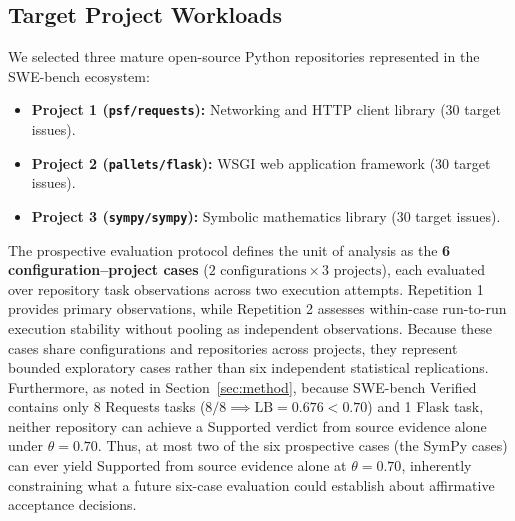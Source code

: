 \documentclass[runningheads]{llncs}
\begin{document}
\subsection{Target Project Workloads}
We selected three mature open-source Python repositories represented in the SWE-bench ecosystem:
\begin{itemize}[leftmargin=*]
    \item \textbf{Project 1 (\texttt{psf/requests}):} Networking and HTTP client library (30 target issues).
    \item \textbf{Project 2 (\texttt{pallets/flask}):} WSGI web application framework (30 target issues).
    \item \textbf{Project 3 (\texttt{sympy/sympy}):} Symbolic mathematics library (30 target issues).
\end{itemize}
The prospective evaluation protocol defines the unit of analysis as the \textbf{6 configuration--project cases} ($2 \text{ configurations} \times 3 \text{ projects}$), each evaluated over repository task observations across two execution attempts. Repetition 1 provides primary observations, while Repetition 2 assesses within-case run-to-run execution stability without pooling as independent observations. Because these cases share configurations and repositories across projects, they represent bounded exploratory cases rather than six independent statistical replications. Furthermore, as noted in Section~\ref{sec:method}, because SWE-bench Verified contains only 8 Requests tasks ($8/8 \implies \text{LB} = 0.676 < 0.70$) and 1 Flask task, neither repository can achieve a Supported verdict from source evidence alone under $\theta = 0.70$. Thus, at most two of the six prospective cases (the SymPy cases) can ever yield Supported from source evidence alone at $\theta = 0.70$, inherently constraining what a future six-case evaluation could establish about affirmative acceptance decisions.
\end{document}
